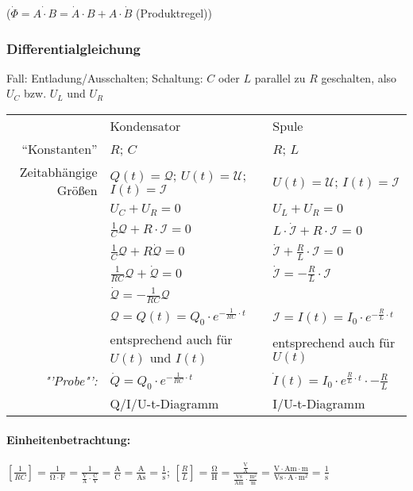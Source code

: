 \documentclass[a4paper]{scrartcl}
\begin{document}
($\dot{\Phi}=\dot{A \cdot B} = \dot{A} \cdot B + A \cdot \dot{B}$
(Produktregel))

\subsubsection{Differentialgleichung}
Fall: Entladung/Ausschalten; Schaltung: $C$ oder $L$ parallel zu $R$
geschalten, also $U_C$ bzw. $U_L$ und $U_R$
\\ \begin{tabular}{rl|l}
& Kondensator						& Spule \\ %
"`Konstanten"'&$R$; $C$				& $R$; $L$ \\
Zeitabhängige Größen & $Q(t)=\mathcal{Q}$; $U(t)=\mathcal{U}$;
	$I(t)=\mathcal{I}$ 				& $U(t)=\mathcal{U}$; $I(t)=\mathcal{I}$ \\
& $U_C + U_R = 0$ & $U_L + U_R = 0$ \\
& $\frac{1}{C} \mathcal{Q} + R \cdot \mathcal{I} = 0$ &
	$L \cdot \dot{\mathcal{I}} + R \cdot \mathcal{I}$ = 0 \\
& $\frac{1}{C} \mathcal{Q} + R \dot{\mathcal{Q}} = 0$ &
	$\dot{\mathcal{I}} + \frac{R}{L} \cdot \mathcal{I} = 0$ \\
& $\frac{1}{RC} \mathcal{Q} + \dot{\mathcal{Q}} = 0$ &
	$\dot{\mathcal{I}} = -\frac{R}{L} \cdot \mathcal{I}$ \\
& $\dot{\mathcal{Q}} = - \frac{1}{RC} \mathcal{Q}$ & \\
\hline %
& $\mathcal{Q} = Q(t) = Q_0 \cdot e^{-\frac{1}{RC} \cdot t}$ &
	$\mathcal{I} = I(t) = I_0 \cdot e^{-\frac{R}{L} \cdot t}$ \\
& entsprechend auch für $U(t)$ und $I(t)$ & entsprechend auch für $U(t)$ \\
\emph{"'Probe"':} & $\dot{Q} = Q_0 \cdot e^{-\frac{1}{RC} \cdot t}$ &
	$\dot{I}(t) = I_0 \cdot e^{\frac{R}{L} \cdot t} \cdot -\frac{R}{L}$ \\
& Q/I/U-t-Diagramm & I/U-t-Diagramm \\
\end{tabular}
\paragraph{Einheitenbetrachtung:} $[\frac{1}{RC}] = \mathrm{\frac{1}{\Omega
\cdot F} = \frac{1}{\frac{V}{A} \cdot
\frac{C}{V}} = \frac{A}{C} = \frac{A}{As} = \frac{1}{s}}$;
$[\frac{R}{L}] = \mathrm{\frac{\Omega}{H} = \frac{\frac{V}{A}}{\frac{Vs}{Am}
\cdot \frac{m^2}{m}} = \frac{V \cdot Am \cdot m}{Vs \cdot A \cdot m^2} =
\frac{1}{s}}$
\end{document}

